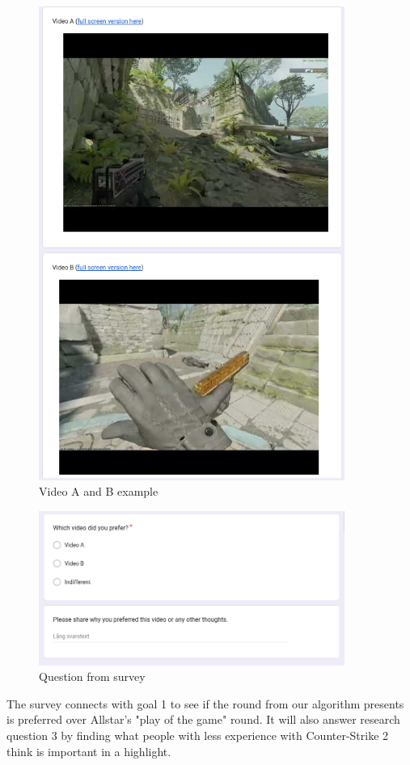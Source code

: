 \begin{itemize}
\begin{figure}[H]
        \includegraphics[width=10cm]{Images/A-B_choices.png}
        \caption{Video A and B example}
        \label{fig:VideoA_B}
    \end{figure}
    \begin{figure}[H]
        \centering
        \includegraphics[width=10cm]{Images/Questions_AB_reason_Survey.png}
        \caption{Question from survey}
        \label{fig:VideoA_B_answer_reason}
    \end{figure}
\end{itemize}
The survey connects with goal 1 to see if the round from our algorithm presents is preferred over Allstar's "play of the game" round. It will also answer research question 3 by finding what people with less experience with Counter-Strike 2 think is important in a highlight.\\\\
